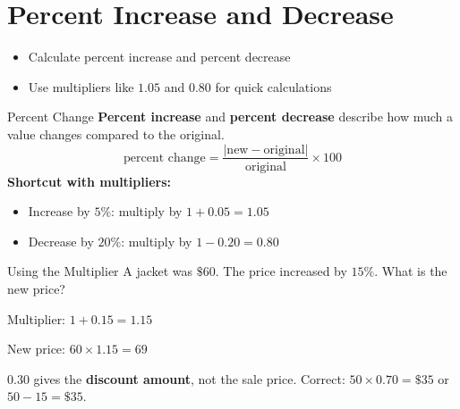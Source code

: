 \section{Percent Increase and Decrease}

\begin{learningGoals}
\begin{itemize}
    \item Calculate percent increase and percent decrease
    \item Use multipliers like $1.05$ and $0.80$ for quick calculations
\end{itemize}
\end{learningGoals}

\begin{conceptBox}{Percent Change}
\textbf{Percent increase} and \textbf{percent decrease} describe how much a value changes compared to the original.
$$\text{percent change} = \frac{|\text{new} - \text{original}|}{\text{original}} \times 100$$
\textbf{Shortcut with multipliers:}
\begin{itemize}[leftmargin=*]
    \item Increase by $5\%$: multiply by $1 + 0.05 = 1.05$
    \item Decrease by $20\%$: multiply by $1 - 0.20 = 0.80$
\end{itemize}
\end{conceptBox}

\begin{workedExample}{Using the Multiplier}
A jacket was $\$60$. The price increased by $15\%$. What is the new price?

Multiplier: $1 + 0.15 = 1.15$

New price: $60 \times 1.15 = 69$
\end{workedExample}

\begin{errorBox}
$0.30$ gives the \textbf{discount amount}, not the sale price.
Correct: $50 \times 0.70 = \$35$ or $50 - 15 = \$35$.
\end{errorBox}

